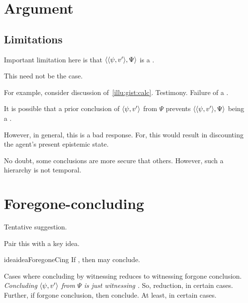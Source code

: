 \section{Argument}
\label{sec:argument}



\subsection{Limitations}

\begin{note}
  Important limitation here is that \(\langle \langle \psi, v' \rangle, \Psi \rangle\) is a \requ{}.

  This need not be the case.

  For example, consider discussion of~\autoref{illu:gist:calc}.
  Testimony.
  Failure of a \requ{}.

  It is possible that a prior conclusion of \(\langle \psi, v' \rangle\) from \(\Psi\) prevents \(\langle \langle \psi, v' \rangle, \Psi \rangle\) being a \requ{}.

  However, in general, this is a bad response.
  For, this would result in discounting the agent's present epistemic state.

  No doubt, some conclusions are more secure that others.
  However, such a hierarchy is not temporal.
\end{note}

\section{Foregone-concluding}

\begin{note}
  Tentative suggestion.
\end{note}

\begin{note}
  Pair this with a key idea.

  \begin{restatable}{idea}{ideaForegoneCing}
    \label{idea:reassignment}
    If \fc{}, then may conclude.
  \end{restatable}

  Cases where concluding by witnessing reduces to witnessing forgone conclusion.
  \emph{Concluding \(\langle \psi, v' \rangle\) from \(\Psi\) is just witnessing \fc{}.}
  So, reduction, in certain cases.
  Further, if forgone conclusion, then conclude.
  At least, in certain cases.
\end{note}

